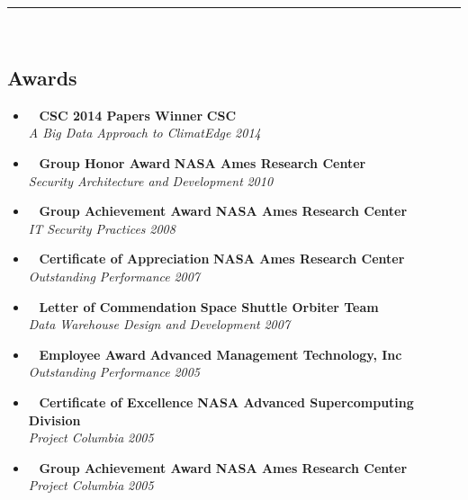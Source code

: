 \hrule\
\vspace{-0.4em}
\subsection*{Awards}

\begin{itemize}
	\parskip=0.1em
	\item\ 
	\headerrow
		{\textbf{CSC 2014 Papers Winner}}
		{\textbf{CSC}}
	\\
	\headerrow
		{\emph{A Big Data Approach to ClimatEdge\texttrademark}}
		{\emph{2014}}

	\item\ 
	\headerrow
		{\textbf{Group Honor Award}}
		{\textbf{NASA Ames Research Center}}
	\\
	\headerrow
		{\emph{Security Architecture and Development}}
		{\emph{2010}}

	\item\ 
	\headerrow
		{\textbf{Group Achievement Award}}
		{\textbf{NASA Ames Research Center}}
	\\
	\headerrow
		{\emph{IT Security Practices}}
		{\emph{2008}}

	\item\ 
	\headerrow
		{\textbf{Certificate of Appreciation}}
		{\textbf{NASA Ames Research Center}}
	\\
	\headerrow
		{\emph{Outstanding Performance}}
		{\emph{2007}}
	
	\item\ 
	\headerrow
		{\textbf{Letter of Commendation}}
		{\textbf{Space Shuttle Orbiter Team}}
	\\
	\headerrow
		{\emph{Data Warehouse Design and Development}}
		{\emph{2007}}
		
	\item\ 
	\headerrow
		{\textbf{Employee Award}}
		{\textbf{Advanced Management Technology, Inc}}
	\\
	\headerrow
		{\emph{Outstanding Performance}}
		{\emph{2005}}

	\item\ 
	\headerrow
		{\textbf{Certificate of Excellence}}
		{\textbf{NASA Advanced Supercomputing Division}}
	\\
	\headerrow
		{\emph{Project Columbia}}
		{\emph{2005}}

	\item\ 
	\headerrow
		{\textbf{Group Achievement Award}}
		{\textbf{NASA Ames Research Center}}
	\\
	\headerrow
		{\emph{Project Columbia}}
		{\emph{2005}}


\end{itemize}
